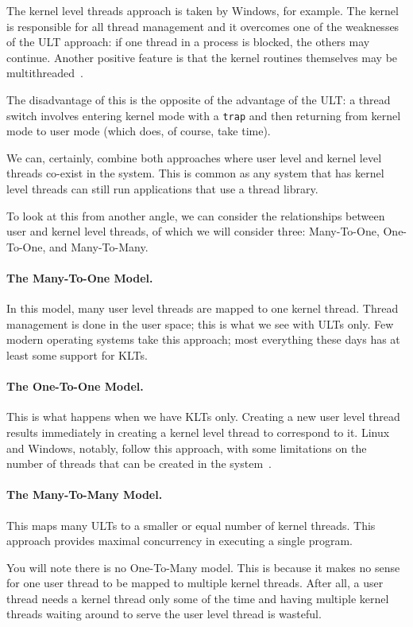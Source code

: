 The kernel level threads approach is taken by Windows, for example. The kernel is responsible for all thread management and it overcomes one of the weaknesses of the ULT approach: if one thread in a process is blocked, the others may continue. Another positive feature is that the kernel routines themselves may be multithreaded~\cite{osi}.

The disadvantage of this is the opposite of the advantage of the ULT: a thread switch involves entering kernel mode with a \texttt{trap} and then returning from kernel mode to user mode (which does, of course, take time).

We can, certainly, combine both approaches where user level and kernel level threads co-exist in the system. This is common as any system that has kernel level threads can still run applications that use a thread library. 

To look at this from another angle, we can consider the relationships between user and kernel level threads, of which we will consider three: Many-To-One, One-To-One, and Many-To-Many.

\paragraph{The Many-To-One Model.} In this model, many user level threads are mapped to one kernel thread. Thread management is done in the user space; this is what we see with ULTs only. Few modern operating systems take this approach; most everything these days has at least some support for KLTs.

\paragraph{The One-To-One Model.} This is what happens when we have KLTs only. Creating a new user level thread results immediately in creating a kernel level thread to correspond to it. Linux and Windows, notably, follow this approach, with some limitations on the number of threads that can be created in the system~\cite{osc}.

\paragraph{The Many-To-Many Model.} This maps many ULTs to a smaller or equal number of kernel threads. This approach provides maximal concurrency in executing a single program.

You will note there is no One-To-Many model. This is because it makes no sense for one user thread to be mapped to multiple kernel threads. After all, a user thread needs a kernel thread only some of the time and having multiple kernel threads waiting around to serve the user level thread is wasteful.

